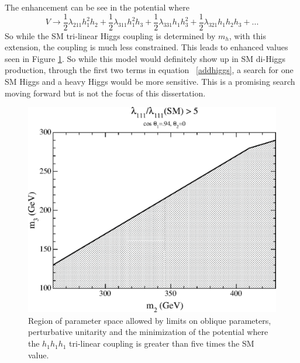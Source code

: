 The enhancement can be see in the potential where 
\begin{equation}
V \rightarrow \frac{1}{2}\lambda_{211}h_{1}^{2}h_{2} + \frac{1}{2}\lambda_{311}h_{1}^{2}h_{3} + \frac{1}{2}\lambda_{331}h_{1}h_{3}^{2} + \frac{1}{2}\lambda_{321}h_{1}h_{2}h_{3} + . . .
\label{addhiggs}
\end{equation}
So while the SM tri-linear Higgs coupling is determined by ${m_{h}}$, with this extension, the coupling is much less constrained. This leads to enhanced values seen in Figure \ref{fig:CHS8}. So while this model would definitely show up in SM di-Higgs production, through the first two terms in equation ~\ref{addhiggs}, a search for one SM Higgs and a heavy Higgs would be more sensitive. This is a promising search moving forward but is not the focus of this dissertation.
\begin{figure}[h]
\begin{center}
\includegraphics[scale=0.7]{figures/CompHiggsSing_Fig8}
\caption[Allowed regions of parameter space with enhanced tri-linear coupling]{Region of parameter space allowed by limits on oblique parameters, perturbative unitarity and the minimization of the potential where the ${h_{1}h_{1}h_{1}}$ tri-linear coupling is greater than five times the SM value.}
\label{fig:CHS8}
\end{center}
\end{figure}

